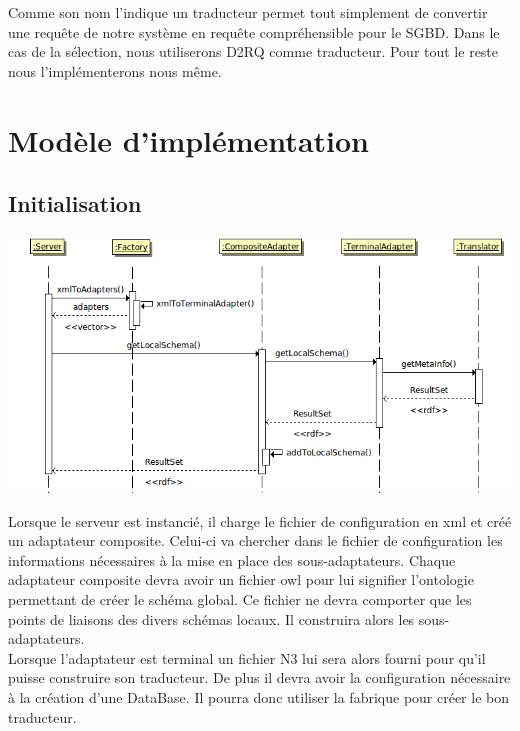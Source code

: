 \documentclass[12pt]{article}
\begin{document}
	Comme son nom l'indique un traducteur permet tout simplement de convertir une requête de notre système en requête compréhensible pour le SGBD. Dans le cas de la sélection, nous utiliserons D2RQ comme traducteur. Pour tout le reste nous l'implémenterons nous même.

\newpage

\section{Modèle d'implémentation}

\subsection{Initialisation}

\begin{center}
	\includegraphics[scale=0.60]{images/sequence_init.png}
\end{center}

	Lorsque le serveur est instancié, il charge le fichier de configuration en xml et créé un adaptateur composite. Celui-ci va chercher dans le fichier de configuration les informations nécessaires à la mise en place des sous-adaptateurs. Chaque adaptateur composite devra avoir un fichier owl pour lui signifier l'ontologie permettant de créer le schéma global. Ce fichier ne devra comporter que les points de liaisons des divers schémas locaux. Il construira alors les sous-adaptateurs. \\

\indent Lorsque l'adaptateur est terminal un fichier N3 lui sera alors fourni pour qu'il puisse construire son traducteur. De plus il devra avoir la configuration nécessaire à la création d'une DataBase. Il pourra donc utiliser la fabrique pour créer le bon traducteur.
\end{document}
